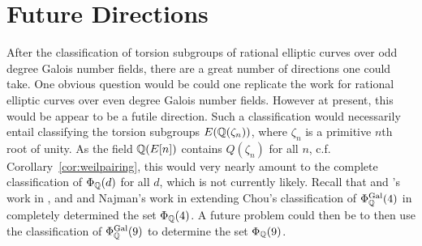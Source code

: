 \chapter{Future Directions\label{ch:future}}

After the classification of torsion subgroups of rational elliptic curves over odd degree Galois number fields, there are a great number of directions one could take. One obvious question would be could one replicate the work for rational elliptic curves over even degree Galois number fields. However at present, this would be appear to be a futile direction. Such a classification would necessarily entail classifying the torsion subgroups $E(\mathbb{Q}(\zeta_n))$, where $\zeta_n$ is a primitive $n$th root of unity. As the field $\mathbb{Q}(E[n])$ contains $Q(\zeta_n)$ for all $n$, c.f. Corollary~\ref{cor:weilpairing}, this would very nearly amount to the complete classification of $\Phi_{\mathbb{Q}}(d)$ for all $d$, which is not currently likely. Recall that \gonjim{} and \lozrob's work in \cite{gonzalezjimenezlozanorobledo18}, and \gonjim{} and Najman's work in \cite{gonzalezjimeneznajman20base} extending  Chou's classification of $\Phi_{\mathbb{Q}}^{\operatorname{Gal}}(4)$ in \cite{chou16} completely determined the set $\Phi_{\mathbb{Q}}(4)$. A future problem could then be to then use the classification of $\Phi_{\mathbb{Q}}^{\operatorname{Gal}}(9)$ to determine the set $\Phi_{\mathbb{Q}}(9)$. 


